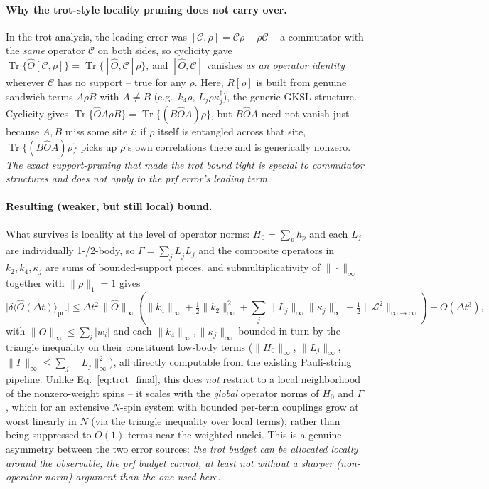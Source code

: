 \documentclass[11pt]{article}
\newcommand{\Dt}{\Delta t}
\newcommand{\calL}{\mathcal{L}}
\newcommand{\calC}{\mathcal{C}}
\DeclareMathOperator{\Tr}{Tr}
\begin{document}
\paragraph{Why the trot-style locality pruning does not carry over.} In the trot analysis, the leading error was $[\calC,\rho]=\calC\rho-\rho\calC$ -- a commutator with the \emph{same} operator $\calC$ on both sides, so cyclicity gave $\Tr\{\hat{O}[\calC,\rho]\}=\Tr\{[\hat{O},\calC]\rho\}$, and $[\hat{O},\calC]$ vanishes \emph{as an operator identity} wherever $\calC$ has no support -- true for any $\rho$. Here, $R[\rho]$ is built from genuine sandwich terms $A\rho B$ with $A\neq B$ (e.g.\ $k_4\rho$, $L_j\rho\kappa_j^\dagger$), the generic GKSL structure. Cyclicity gives $\Tr\{\hat{O}A\rho B\}=\Tr\{(B\hat{O}A)\rho\}$, but $B\hat{O}A$ need not vanish just because $A,B$ miss some site $i$: if $\rho$ itself is entangled across that site, $\Tr\{(B\hat{O}A)\rho\}$ picks up $\rho$'s own correlations there and is generically nonzero. \emph{The exact support-pruning that made the trot bound tight is special to commutator structures and does not apply to the prf error's leading term.}

\paragraph{Resulting (weaker, but still local) bound.} What survives is locality at the level of operator norms: $H_0=\sum_ph_p$ and each $L_j$ are individually 1-/2-body, so $\Gamma=\sum_jL_j^\dagger L_j$ and the composite operators in $k_2,k_4,\kappa_j$ are sums of bounded-support pieces, and submultiplicativity of $\|\cdot\|_\infty$ together with $\|\rho\|_1=1$ gives
\begin{equation}\label{eq:prf_final}
    \big|\delta\langle\hat{O}(\Dt)\rangle_{\text{prf}}\big| \le \Dt^2\,\|\hat{O}\|_\infty\left(\|k_4\|_\infty+\tfrac12\|k_2\|_\infty^2+\sum_j\|L_j\|_\infty\|\kappa_j\|_\infty+\tfrac12\|\calL^2\|_{\infty\to\infty}\right)+O(\Dt^3),
\end{equation}
with $\|\hat{O}\|_\infty\le\sum_i|w_i|$ and each $\|k_4\|_\infty,\|\kappa_j\|_\infty$ bounded in turn by the triangle inequality on their constituent low-body terms ($\|H_0\|_\infty$, $\|L_j\|_\infty$, $\|\Gamma\|_\infty\le\sum_j\|L_j\|_\infty^2$), all directly computable from the existing Pauli-string pipeline. Unlike Eq.~\eqref{eq:trot_final}, this does \emph{not} restrict to a local neighborhood of the nonzero-weight spins -- it scales with the \emph{global} operator norms of $H_0$ and $\Gamma$, which for an extensive $N$-spin system with bounded per-term couplings grow at worst linearly in $N$ (via the triangle inequality over local terms), rather than being suppressed to $O(1)$ terms near the weighted nuclei. This is a genuine asymmetry between the two error sources: \emph{the trot budget can be allocated locally around the observable; the prf budget cannot, at least not without a sharper (non-operator-norm) argument than the one used here.}
\end{document}
